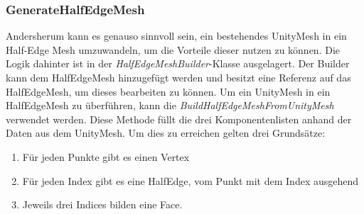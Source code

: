 \subsubsection{GenerateHalfEdgeMesh}
Andersherum kann es genauso sinnvoll sein, ein bestehendes UnityMesh in ein Half-Edge Mesh umzuwandeln, um die Vorteile dieser nutzen zu k\"onnen. Die Logik dahinter ist in der \textit{HalfEdgeMeshBuilder}-Klasse ausgelagert. Der Builder kann dem HalfEdgeMesh hinzugef\"ugt werden und besitzt eine Referenz auf das HalfEdgeMesh, um dieses bearbeiten zu k\"onnen. Um ein UnityMesh in ein HalfEdgeMesh zu \"uberf\"uhren, kann die \textit{BuildHalfEdgeMeshFromUnityMesh} verwendet werden. Diese Methode f\"ullt die drei Komponentenlisten anhand der Daten aus dem UnityMesh. 
Um dies zu erreichen gelten drei Grunds\"atze:
\begin{enumerate}
	\item F\"ur jeden Punkte gibt es einen Vertex
	\item F\"ur jeden Index gibt es eine HalfEdge, vom Punkt mit dem Index ausgehend
	\item Jeweils drei Indices bilden eine Face.
\end{enumerate}
